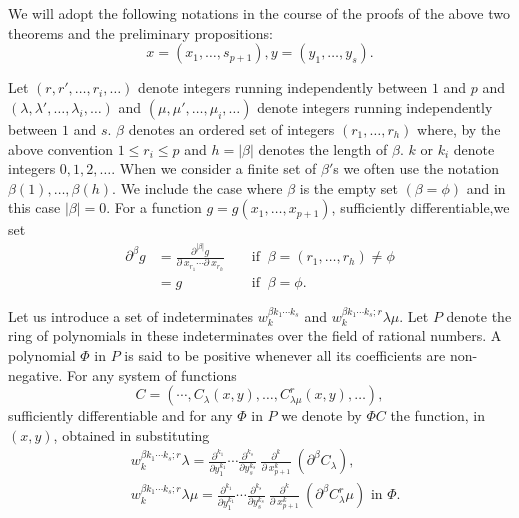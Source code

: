 \section{}\label{chap1:sec1.6}%

We will adopt the following notations in the course of the proofs of
the above two theorems and the preliminary propositions: 
$$
x = (x_1,  \ldots,  s_{p+1}),  y = (y_1,  \ldots,  y_s).
$$

Let $(r,  r',  \ldots,  r_i,  \ldots)$ denote integers running
independently between $1$ and $p$ and $(\lambda,  \lambda',  \ldots,
\lambda_i,  \ldots)$ and $(\mu,  \mu',  \ldots,  \mu_i,  \ldots)$
denote integers running independently between $1$ and $s$. $\beta$
denotes an ordered set of integers $(r_1,  \ldots,  r_h)$ where,  by
the above convention $1 \le r_i \le p$ and $h = | \beta |$ denotes the
length of $\beta$. $k$ or $k_i$ denote integers $0,  1,  2,
\ldots$. When we consider a finite set of $\beta'$s we often use the
notation $\beta(1),  \ldots,  \beta(h)$. We include the case where
$\beta$ is the empty set $(\beta = \phi)$ and in this case $| \beta |
= 0$. For a function $g = g(x_1,  \ldots,  x_{p+1})$,  sufficiently
differentiable,\pageoriginale  we set  
\begin{align*}
  \partial^\beta g & = \frac{\partial^{|\beta|}g}{\partial ~ x_{r_1}
    \cdots \partial ~ x_{r_h}} &&\text{ if  }~ \beta  = (r_1,  \ldots,
  r_h) \neq \phi\\ 
  & = g &&\text{ if }~ \beta = \phi.
\end{align*}

Let us introduce a set of indeterminates $w^{\beta k_1 \cdots k_s}_k$
and $w^{\beta k_1 \cdots k_s;r}_k \lambda \mu$. Let $P$ denote the
ring of polynomials in these indeterminates over the field of rational
numbers. A polynomial $\Phi$ in $P$ is said to be positive whenever
all its coefficients are non-negative. For any system of functions 
$$
C = (\cdots,  C_\lambda (x, y),  \ldots,  C^r_{\lambda\mu}(x, y),  \ldots ), 
$$
sufficiently differentiable and for any $\Phi$ in $P$ we denote by
$\Phi C$ the function,  in $(x, y)$,  obtained in substituting 
\begin{align*}
  & w^{\beta k_1 \cdots k_s;r}_k \lambda =
  \frac{\partial^{k_1}}{\partial y^{k_1}_1} \cdots
  \frac{\partial^{k_s}}{\partial y^{k_s}_s} ~
  \frac{\partial^k}{\partial ~ x^k_{p+1}} ~ (\partial^\beta
  C_\lambda), \\ 
  & w^{\beta k_1 \cdots k_s;r}_k \lambda\mu =
  \frac{\partial^{k_1}}{\partial y^{k_1}_1} \cdots
  \frac{\partial^{k_s}}{\partial y^{k_s}_s} ~
  \frac{\partial^k}{\partial ~ x^k_{p+1}} ~ (\partial^\beta
  C^r_\lambda\mu) \text{ in } \Phi. 
\end{align*}

